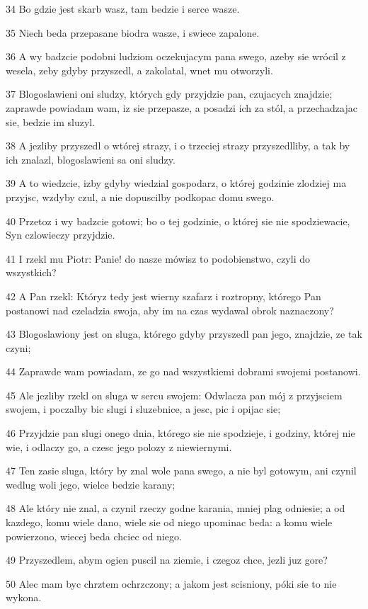 \par 34 Bo gdzie jest skarb wasz, tam bedzie i serce wasze.
\par 35 Niech beda przepasane biodra wasze, i swiece zapalone.
\par 36 A wy badzcie podobni ludziom oczekujacym pana swego, azeby sie wrócil z wesela, zeby gdyby przyszedl, a zakolatal, wnet mu otworzyli.
\par 37 Blogoslawieni oni sludzy, których gdy przyjdzie pan, czujacych znajdzie; zaprawde powiadam wam, iz sie przepasze, a posadzi ich za stól, a przechadzajac sie, bedzie im sluzyl.
\par 38 A jezliby przyszedl o wtórej strazy, i o trzeciej strazy przyszedlliby, a tak by ich znalazl, blogoslawieni sa oni sludzy.
\par 39 A to wiedzcie, izby gdyby wiedzial gospodarz, o której godzinie zlodziej ma przyjsc, wzdyby czul, a nie dopuscilby podkopac domu swego.
\par 40 Przetoz i wy badzcie gotowi; bo o tej godzinie, o której sie nie spodziewacie, Syn czlowieczy przyjdzie.
\par 41 I rzekl mu Piotr: Panie! do nasze mówisz to podobienstwo, czyli do wszystkich?
\par 42 A Pan rzekl: Któryz tedy jest wierny szafarz i roztropny, którego Pan postanowi nad czeladzia swoja, aby im na czas wydawal obrok naznaczony?
\par 43 Blogoslawiony jest on sluga, którego gdyby przyszedl pan jego, znajdzie, ze tak czyni;
\par 44 Zaprawde wam powiadam, ze go nad wszystkiemi dobrami swojemi postanowi.
\par 45 Ale jezliby rzekl on sluga w sercu swojem: Odwlacza pan mój z przyjsciem swojem, i poczalby bic slugi i sluzebnice, a jesc, pic i opijac sie;
\par 46 Przyjdzie pan slugi onego dnia, którego sie nie spodzieje, i godziny, której nie wie, i odlaczy go, a czesc jego polozy z niewiernymi.
\par 47 Ten zasie sluga, który by znal wole pana swego, a nie byl gotowym, ani czynil wedlug woli jego, wielce bedzie karany;
\par 48 Ale który nie znal, a czynil rzeczy godne karania, mniej plag odniesie; a od kazdego, komu wiele dano, wiele sie od niego upominac beda: a komu wiele powierzono, wiecej beda chciec od niego.
\par 49 Przyszedlem, abym ogien puscil na ziemie, i czegoz chce, jezli juz gore?
\par 50 Alec mam byc chrztem ochrzczony; a jakom jest scisniony, póki sie to nie wykona.

